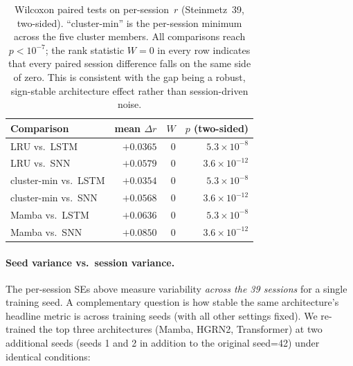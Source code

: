 \documentclass{article}
\begin{document}
\begin{table}[h]
  \caption{Wilcoxon paired tests on per-session~$r$ (Steinmetz~39,
    two-sided).  ``cluster-min'' is the per-session minimum across the
    five cluster members.  All comparisons reach $p{<}10^{-7}$; the
    rank statistic $W{=}0$ in every row indicates that every paired
    session difference falls on the same side of zero.  This is
    consistent with the gap being a robust, sign-stable architecture
    effect rather than session-driven noise.}
  \label{tab:wilcoxon-gap}
  \centering
  \small
  \begin{tabular}{@{} l r r r @{}}
    \toprule
    \textbf{Comparison} & \textbf{mean $\Delta r$} & \textbf{$W$}
      & \textbf{$p$ (two-sided)} \\
    \midrule
    LRU vs.\ LSTM       & $+0.0365$ & $0$ & $5.3{\times}10^{-8}$  \\
    LRU vs.\ SNN        & $+0.0579$ & $0$ & $3.6{\times}10^{-12}$ \\
    cluster-min vs.\ LSTM & $+0.0354$ & $0$ & $5.3{\times}10^{-8}$  \\
    cluster-min vs.\ SNN  & $+0.0568$ & $0$ & $3.6{\times}10^{-12}$ \\
    \midrule
    Mamba vs.\ LSTM     & $+0.0636$ & $0$ & $5.3{\times}10^{-8}$  \\
    Mamba vs.\ SNN      & $+0.0850$ & $0$ & $3.6{\times}10^{-12}$ \\
    \bottomrule
  \end{tabular}
\end{table}

\paragraph{Seed variance vs.\ session variance.}
The per-session SEs above measure variability \emph{across the 39
sessions} for a single training seed.  A complementary question is
how stable the same architecture's headline metric is across training
seeds (with all other settings fixed).  We re-trained the top three
architectures (Mamba, HGRN2, Transformer) at two additional seeds
(seeds 1 and 2 in addition to the original seed=42) under identical
conditions:
\end{document}
